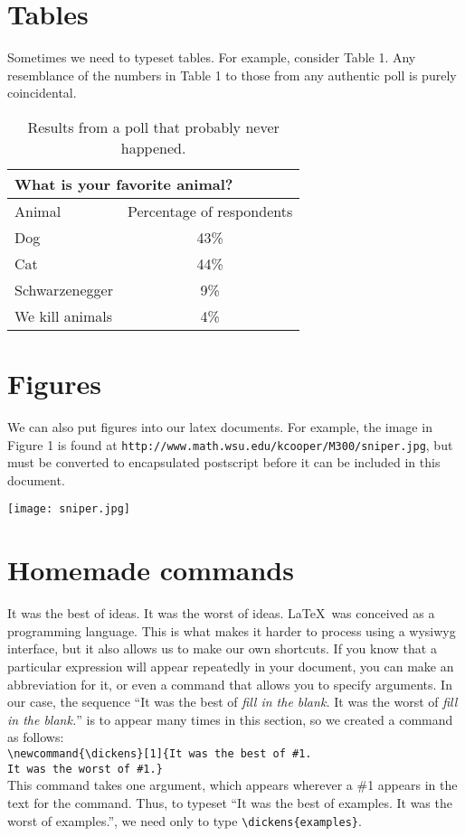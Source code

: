 \documentclass[a4paper,12pt]{extarticle}
\begin{document}
\section{Tables}
Sometimes we need to typeset tables. For example, consider Table 1. Any
resemblance of the numbers in Table 1 to those from any authentic poll is
purely coincidental. \\
\begin{table}[t]
\caption{Results from a poll that probably never happened.}
\centering
\begin{tabular}{|| l | c ||}

\hline
\multicolumn{2}{||l||}{What is your favorite animal?} \\
\hline
Animal & Percentage of respondents \\
\hline
Dog & 43\% \\
Cat & 44\% \\
Schwarzenegger & 9\% \\
We kill animals & 4\% \\
\hline \hline
\end{tabular}
\end{table}

\section{Figures}
We can also put figures into our latex documents. For example, the image in
Figure 1 is found at \verb|http://www.math.wsu.edu/kcooper/M300/sniper.jpg|, but must be converted to encapsulated postscript before it can be included
in this document.
\texttt{[image: sniper.jpg]}

\section{Homemade commands}
It was the best of ideas. It was the worst of ideas. \LaTeX\ was conceived as
a programming language. This is what makes it harder to process using a
wysiwyg interface, but it also allows us to make our own shortcuts. If you
know that a particular expression will appear repeatedly in your document,
you can make an abbreviation for it, or even a command that allows you to
specify arguments. In our case, the sequence ``It was the best of \textit{fill in the
blank.} It was the worst of \textit{fill in the blank.}'' is to appear many times in this
section, so we created a command as follows:\bigskip \\
\verb|\newcommand{\dickens}[1]{It was the best of #1.| \\
\verb|It was the worst of #1.}|\bigskip \\
This command takes one argument, which appears wherever a \#1 appears
in the text for the command. Thus, to typeset ``It was the best of examples.
It was the worst of examples.'', we need only to type \verb|\dickens{examples}|.
\end{document}
